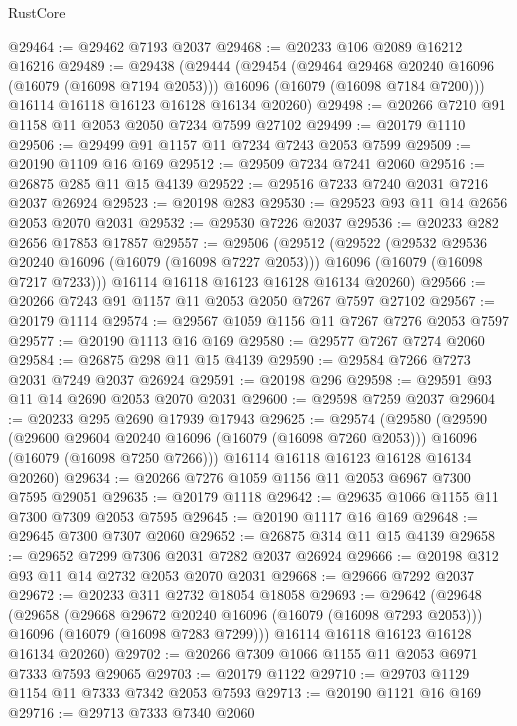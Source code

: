 \begin{lexlean}{RustCore}
\begin{coremodule}
@29464 := @29462 @7193 @2037
@29468 := @20233 @106 @2089 @16212 @16216
@29489 := @29438
    (@29444
      (@29454
        (@29464 @29468 @20240 @16096 (@16079 (@16098 @7194 @2053)))
        @16096
        (@16079 (@16098 @7184 @7200)))
      @16114
      @16118
      @16123
      @16128
      @16134
      @20260)
@29498 := @20266 @7210 @91 @1158 @11 @2053 @2050 @7234 @7599 @27102
@29499 := @20179 @1110
@29506 := @29499 @91 @1157 @11 @7234 @7243 @2053 @7599
@29509 := @20190 @1109 @16 @169
@29512 := @29509 @7234 @7241 @2060
@29516 := @26875 @285 @11 @15 @4139
@29522 := @29516 @7233 @7240 @2031 @7216 @2037 @26924
@29523 := @20198 @283
@29530 := @29523 @93 @11 @14 @2656 @2053 @2070 @2031
@29532 := @29530 @7226 @2037
@29536 := @20233 @282 @2656 @17853 @17857
@29557 := @29506
    (@29512
      (@29522
        (@29532 @29536 @20240 @16096 (@16079 (@16098 @7227 @2053)))
        @16096
        (@16079 (@16098 @7217 @7233)))
      @16114
      @16118
      @16123
      @16128
      @16134
      @20260)
@29566 := @20266 @7243 @91 @1157 @11 @2053 @2050 @7267 @7597 @27102
@29567 := @20179 @1114
@29574 := @29567 @1059 @1156 @11 @7267 @7276 @2053 @7597
@29577 := @20190 @1113 @16 @169
@29580 := @29577 @7267 @7274 @2060
@29584 := @26875 @298 @11 @15 @4139
@29590 := @29584 @7266 @7273 @2031 @7249 @2037 @26924
@29591 := @20198 @296
@29598 := @29591 @93 @11 @14 @2690 @2053 @2070 @2031
@29600 := @29598 @7259 @2037
@29604 := @20233 @295 @2690 @17939 @17943
@29625 := @29574
    (@29580
      (@29590
        (@29600 @29604 @20240 @16096 (@16079 (@16098 @7260 @2053)))
        @16096
        (@16079 (@16098 @7250 @7266)))
      @16114
      @16118
      @16123
      @16128
      @16134
      @20260)
@29634 := @20266 @7276 @1059 @1156 @11 @2053 @6967 @7300 @7595 @29051
@29635 := @20179 @1118
@29642 := @29635 @1066 @1155 @11 @7300 @7309 @2053 @7595
@29645 := @20190 @1117 @16 @169
@29648 := @29645 @7300 @7307 @2060
@29652 := @26875 @314 @11 @15 @4139
@29658 := @29652 @7299 @7306 @2031 @7282 @2037 @26924
@29666 := @20198 @312 @93 @11 @14 @2732 @2053 @2070 @2031
@29668 := @29666 @7292 @2037
@29672 := @20233 @311 @2732 @18054 @18058
@29693 := @29642
    (@29648
      (@29658
        (@29668 @29672 @20240 @16096 (@16079 (@16098 @7293 @2053)))
        @16096
        (@16079 (@16098 @7283 @7299)))
      @16114
      @16118
      @16123
      @16128
      @16134
      @20260)
@29702 := @20266 @7309 @1066 @1155 @11 @2053 @6971 @7333 @7593 @29065
@29703 := @20179 @1122
@29710 := @29703 @1129 @1154 @11 @7333 @7342 @2053 @7593
@29713 := @20190 @1121 @16 @169
@29716 := @29713 @7333 @7340 @2060

\end{coremodule}
\end{lexlean}
